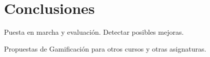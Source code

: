 
\chapter{Conclusiones}
\label{chap:conclusiones}




\label{sec:trabajos_futuros}

Puesta en marcha y evaluación. Detectar posibles mejoras.

Propuestas de Gamificación para otros cursos y otras asignaturas.
